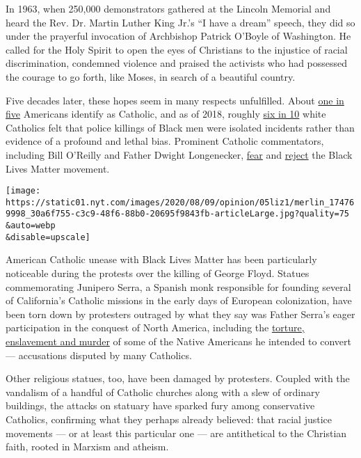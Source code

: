 In 1963, when 250,000 demonstrators gathered at the Lincoln Memorial and
heard the Rev. Dr. Martin Luther King Jr.'s ``I have a dream'' speech,
they did so under the prayerful invocation of Archbishop Patrick O'Boyle
of Washington. He called for the Holy Spirit to open the eyes of
Christians to the injustice of racial discrimination, condemned violence
and praised the activists who had possessed the courage to go forth,
like Moses, in search of a beautiful country.

Five decades later, these hopes seem in many respects unfulfilled. About
\href{https://www.pewforum.org/religious-landscape-study/}{one in five}
Americans identify as Catholic, and as of 2018, roughly
\href{https://www.prri.org/research/partisan-polarization-dominates-trump-era-findings-from-the-2018-american-values-survey/}{six
in 10} white Catholics felt that police killings of Black men were
isolated incidents rather than evidence of a profound and lethal bias.
Prominent Catholic commentators, including Bill O'Reilly and Father
Dwight Longenecker,
\href{https://www.billoreilly.com/b/Bills-Column-on-the-BLM-Organization:-Its-News-to-Us/-20554200728065000.html?dest=/mobile/blogdetail.jsp}{fear}
and
\href{https://www.crisismagazine.com/2020/blacks-lives-matter-but-so-does-the-truth}{reject}
the Black Lives Matter movement.

\texttt{[image: https://static01.nyt.com/images/2020/08/09/opinion/05liz1/merlin\_174769998\_30a6f755-c3c9-48f6-88b0-20695f9843fb-articleLarge.jpg?quality=75\\\&auto=webp\\\&disable=upscale]}

American Catholic unease with Black Lives Matter has been particularly
noticeable during the protests over the killing of George Floyd. Statues
commemorating Junipero Serra, a Spanish monk responsible for founding
several of California's Catholic missions in the early days of European
colonization, have been torn down by protesters outraged by what they
say was Father Serra's eager participation in the conquest of North
America, including the
\href{https://www.nytimes.com/2015/09/30/us/attack-on-statue-of-new-saint-junipero-serra-digs-up-old-conflicts.html}{torture,
enslavement and murder} of some of the Native Americans he intended to
convert --- accusations disputed by many Catholics.

Other religious statues, too, have been damaged by protesters. Coupled
with the vandalism of a handful of Catholic churches along with a slew
of ordinary buildings, the attacks on statuary have sparked fury among
conservative Catholics, confirming what they perhaps already believed:
that racial justice movements --- or at least this particular one ---
are antithetical to the Christian faith, rooted in Marxism and atheism.

